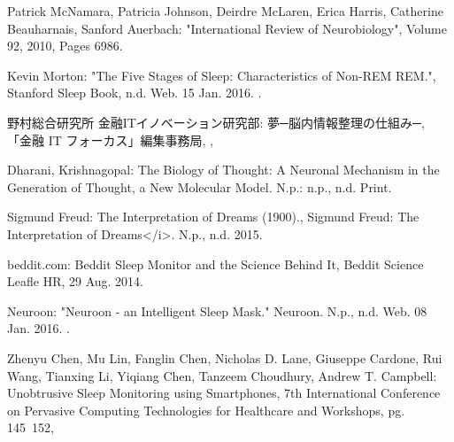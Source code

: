\begin{bib}[100]
\begin{flushleft}
  Patrick McNamara, Patricia Johnson, Deirdre McLaren, Erica Harris, Catherine Beauharnais, Sanford Auerbach:
  \newblock "International Review of Neurobiology",
  \newblock Volume 92, 2010, Pages 6986.
\end{flushleft}

\begin{flushleft}
  Kevin Morton:
  \newblock "The Five Stages of Sleep: Characteristics of Non-REM REM.",
  \newblock Stanford Sleep Book, n.d. Web. 15 Jan. 2016.
  .
\end{flushleft}

\begin{flushleft}
  野村総合研究所 金融ITイノベーション研究部:
  \newblock 夢─脳内情報整理の仕組み─,
  \newblock 「金融 IT フォーカス」編集事務局,
  ,
\end{flushleft}

\begin{flushleft}
  Dharani, Krishnagopal:
  \newblock The Biology of Thought: A Neuronal Mechanism in the Generation of Thought,
  \newblock a New Molecular Model. N.p.: n.p., n.d. Print.
\end{flushleft}

\begin{flushleft}
  Sigmund Freud:
  \newblock The Interpretation of Dreams (1900).,
  \newblock Sigmund Freud: The Interpretation of Dreams</i>. N.p., n.d. 2015.
\end{flushleft}

\begin{flushleft}
  beddit.com:
  \newblock Beddit Sleep Monitor and the Science Behind It,
  \newblock Beddit Science Leafle HR, 29 Aug. 2014.
\end{flushleft}

\begin{flushleft}
  Neuroon:
  \newblock  "Neuroon - an Intelligent Sleep Mask."
  \newblock Neuroon. N.p., n.d. Web. 08 Jan. 2016.
  .
\end{flushleft}

\begin{flushleft}
  Zhenyu Chen, Mu Lin, Fanglin Chen, Nicholas D. Lane, Giuseppe Cardone, Rui Wang, Tianxing Li, Yiqiang Chen, Tanzeem Choudhury, Andrew T. Campbell:
  \newblock  Unobtrusive Sleep Monitoring using Smartphones,
   7th International Conference on Pervasive Computing Technologies for Healthcare and Workshops, pg. 145~152,
\end{flushleft}


\end{bib}
